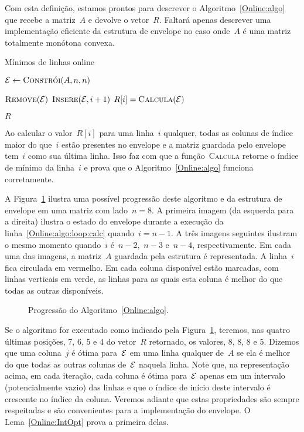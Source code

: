 Com esta definição, estamos prontos para descrever o Algoritmo~\ref{Online:algo} que recebe a matriz~$A$ e devolve o vetor~$R$. Faltará apenas descrever uma implementação eficiente da estrutura de envelope no caso onde~$A$ é uma matriz totalmente monótona convexa.

\begin{algorithm}[h]
\caption{Mínimos de linhas online}
\label{Online:algo}
\begin{algorithmic}[1]
    \State $\mathcal{E} \leftarrow \textsc{Constrói}(A,n,n)$

     \label{Online:algo:loop}
        \State $\textsc{Remove}(\mathcal{E})$
        \State $\textsc{Insere}(\mathcal{E},i+1)$
        \State $R[i] = \textsc{Calcula}(\mathcal{E})$ \label{Online:algo:loop:calc}
    \EndFor

    \State \Return $R$
\EndFunction
\end{algorithmic}
\end{algorithm}

Ao calcular o valor~$R[i]$ para uma linha~$i$ qualquer, todas as colunas de índice maior do que~$i$ estão presentes no envelope e a matriz guardada pelo envelope tem~$i$ como sua última linha. Isso faz com que a função~\textsc{Calcula} retorne o índice de mínimo da linha~$i$ e prova que o Algoritmo~\ref{Online:algo} funciona corretamente.

A Figura~\ref{Online:progress:fig} ilustra uma possível progressão deste algoritmo e da estrutura de envelope em uma matriz com lado~$n = 8$. A primeira imagem (da esquerda para a direita) ilustra o estado do envelope durante a execução da linha~\ref{Online:algo:loop:calc} quando~${ i = n-1 }$. A três imagens seguintes ilustram o mesmo momento quando~$i$ é~${n-2}$,~${n-3}$ e~${n-4}$, respectivamente. Em cada uma das imagens, a matriz~$A$ guardada pela estrutura é representada. A linha~$i$ fica circulada em vermelho. Em cada coluna disponível estão marcadas, com linhas verticais em verde, as linhas para as quais esta coluna é melhor do que todas as outras disponíveis.

\begin{figure}[h]
    \centering
    
    \caption{Progressão do Algoritmo~\ref{Online:algo}.} \label{Online:progress:fig}
\end{figure}

Se o algoritmo for executado como indicado pela Figura~\ref{Online:progress:fig}, teremos, nas quatro últimas posições, 7, 6, 5 e 4 do vetor~$R$ retornado, os valores, 8, 8, 8 e 5. Dizemos que uma coluna~$j$ é ótima para~$\mathcal{E}$ em uma linha qualquer de~$A$ se ela é melhor do que todas as outras colunas de~$\mathcal{E}$ naquela linha. Note que, na representação acima, em cada iteração, cada coluna é ótima para~$\mathcal{E}$ apenas em um intervalo (potencialmente vazio) das linhas e que o índice de início deste intervalo é crescente no índice da coluna. Veremos adiante que estas propriedades são sempre respeitadas e são convenientes para a implementação do envelope. O Lema~\ref{Online:IntOpt} prova a primeira delas.

